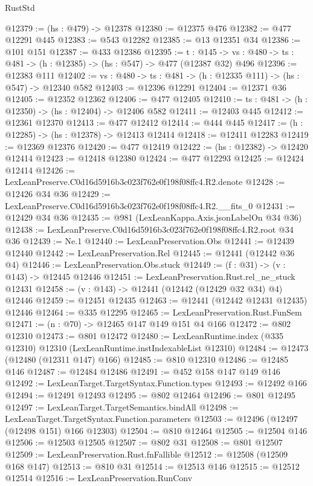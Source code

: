 \begin{lexlean}{RustStd}
\begin{coremodule}
@12379 := (hs : @479) -> @12378
@12380 := @12375 @476
@12382 := @477 @12291 @445
@12383 := @543 @12282
@12385 := @13 @12351 @34
@12386 := @101 @151
@12387 := @433 @12386
@12395 := {t : @145} ->
  {vs : @480} -> {ts : @481} -> (h : @12385) -> (hs : @547) -> @477 (@12387 @32) @496
@12396 := @12383 @111
@12402 := {vs : @480} -> {ts : @481} -> (h : @12335 @111) -> (hs : @547) -> @12340 @582
@12403 := @12396 @12291
@12404 := @12371 @36
@12405 := @12352 @12362
@12406 := @477 @12405
@12410 := {ts : @481} -> (h : @12350) -> (hs : @12404) -> @12406 @582
@12411 := @12403 @445
@12412 := @12361 @12370
@12413 := @477 @12412
@12414 := @444 @445
@12417 := (h : @12285) -> (hs : @12378) -> @12413 @12414
@12418 := @12411 @12283
@12419 := @12369 @12376
@12420 := @477 @12419
@12422 := (hs : @12382) -> @12420 @12414
@12423 := @12418 @12380
@12424 := @477 @12293
@12425 := @12424 @12414
@12426 := LexLeanPreserve.C0d16d5916b3c023f762e0f198f08ffc4.R2.denote
@12428 := @12426 @34 @36
@12429 := LexLeanPreserve.C0d16d5916b3c023f762e0f198f08ffc4.R2.__fits_0
@12431 := @12429 @34 @36
@12435 := @981 (LexLeanKappa.Axis.jsonLabelOn @34 @36)
@12438 := LexLeanPreserve.C0d16d5916b3c023f762e0f198f08ffc4.R2.root @34 @36
@12439 := Ne.{1}
@12440 := LexLeanPreservation.Obs
@12441 := @12439 @12440
@12442 := LexLeanPreservation.Rel
@12445 := @12441 (@12442 @36 @4)
@12446 := LexLeanPreservation.Obs.stuck
@12449 := (f : @31) -> (v : @143) -> @12445 @12446
@12451 := LexLeanPreservation.Rust.rel_ne_stuck @12431
@12458 := (v : @143) -> @12441 (@12442 (@12429 @32 @34) @4) @12446
@12459 := @12451 @12435
@12463 := @12441 (@12442 @12431 @12435) @12446
@12464 := @335 @12295
@12465 := LexLeanPreservation.Rust.FunSem
@12471 := (n : @70) -> @12465 @147 @149 @151 @4 @166
@12472 := @802 @12310
@12473 := @801 @12472
@12480 := LexLeanRuntime.index (@335 @12310) @12310 (LexLeanRuntime.instIndexableList @12310)
@12484 := @12473 (@12480 (@12311 @147) @166)
@12485 := @810 @12310
@12486 := @12485 @146
@12487 := @12484 @12486
@12491 := @452 @158 @147 @149 @146
@12492 := LexLeanTarget.TargetSyntax.Function.types
@12493 := @12492 @166
@12494 := @12491 @12493
@12495 := @802 @12464
@12496 := @801 @12495
@12497 := LexLeanTarget.TargetSemantics.bindAll
@12498 := LexLeanTarget.TargetSyntax.Function.parameters
@12503 := @12496 (@12497 (@12498 @151) @166 @12303)
@12504 := @810 @12464
@12505 := @12504 @146
@12506 := @12503 @12505
@12507 := @802 @31
@12508 := @801 @12507
@12509 := LexLeanPreservation.Rust.fnFallible
@12512 := @12508 (@12509 @168 @147)
@12513 := @810 @31
@12514 := @12513 @146
@12515 := @12512 @12514
@12516 := LexLeanPreservation.RunConv

\end{coremodule}
\end{lexlean}
